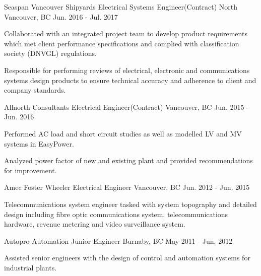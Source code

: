 \begin{cventries}
    \cventry
    {Seaspan Vancouver Shipyards} %
    {Electrical Systems Engineer(Contract)} %
    {North Vancouver, BC} %
    {Jun. 2016 - Jul. 2017} %
    { %
        \begin{cvitems}
            \item {Collaborated with an integrated project team to develop product requirements which met client performance specifications and complied with classification society (DNVGL) regulations.}
            \item {Responsible for performing reviews of electrical, electronic and communications systems design products to ensure technical accuracy and adherence to client and company standards.}
        \end{cvitems}
    }

    \cventry
    {Allnorth Consultants} %
    {Electrical Engineer(Contract)} %
    {Vancouver, BC} %
    {Jun. 2015 - Jun. 2016} %
    { %
        \begin{cvitems}
            \item {Performed AC load and short circuit studies as well as modelled LV and MV systems in EasyPower.}
            \item{Analyzed power factor of new and existing plant and provided recommendations for improvement.}
        \end{cvitems}
    }

    \cventry
    {Amec Foster Wheeler} %
    {Electrical Engineer} %
    {Vancouver, BC} %
    {Jun. 2012 - Jun. 2015} %
    { %
        \begin{cvitems}
            \item {Telecommunications system engineer tasked with system topography and detailed design including fibre optic communications system, telecommunications hardware, revenue metering and video surveillance system.}
        \end{cvitems}
    }
    \cventry
    {Autopro Automation} %
    {Junior Engineer} %
    {Burnaby, BC} %
    {May 2011 - Jun. 2012} %
    { %
        \begin{cvitems}
            \item {Assisted senior engineers with the design of control and automation systems for industrial plants.}
        \end{cvitems}
    }
\end{cventries}